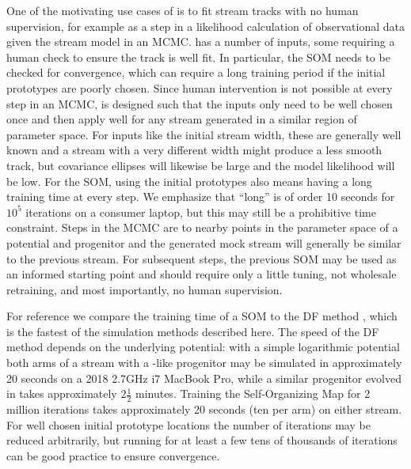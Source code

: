\documentclass[fleqn,usenatbib]{mnras}
\begin{document}
    One of the motivating use cases of \trackstream{} is to fit stream tracks
    with no human supervision, for example as a step in a likelihood calculation
    of observational data given the stream model in an MCMC. \trackstream{} has
    a number of inputs, some requiring a human check to ensure the track is well
    fit. In particular, the SOM needs to be checked for convergence, which can
    require a long training period if the initial prototypes are poorly chosen.
    Since human intervention is not possible at every step in an MCMC,
    \trackstream{} is designed such that the inputs only need to be well chosen
    once and then apply well for any stream generated in a similar region of
    parameter space. For inputs like the initial stream width, these are
    generally well known and a stream with a very different width might produce
    a less smooth track, but covariance ellipses will likewise be large and the
    model likelihood will be low. For the SOM, using the initial prototypes also
    means having a long training time at every step. We emphasize that ``long''
    is of order 10 seconds for $10^5$ iterations on a consumer laptop, but this
    may still be a prohibitive time constraint. Steps in the MCMC are to nearby
    points in the parameter space of a potential and progenitor and the
    generated mock stream will generally be similar to the previous stream. For
    subsequent steps, the previous SOM may be used as an informed starting point
    and should require only a little tuning, not wholesale retraining, and most
    importantly, no human supervision.

    For reference we compare the training time of a SOM to the DF method
    \citep{Bovy2014}, which is the fastest of the simulation methods described
    here. The speed of the DF method depends on the underlying potential: with a
    simple logarithmic potential both arms of a stream with a -like progenitor may be simulated in approximately 20 seconds on a 2018
    2.7GHz i7 MacBook Pro, while a similar progenitor evolved in
    \galpyMWPotential{} takes approximately $2\frac{1}{2}$ minutes. Training the
    Self-Organizing Map for 2 million iterations takes approximately 20 seconds
    (ten per arm) on either stream. For well chosen initial prototype locations
    the number of iterations may be reduced arbitrarily, but running for at
    least a few tens of thousands of iterations can be good practice to ensure
    convergence.
\end{document}
